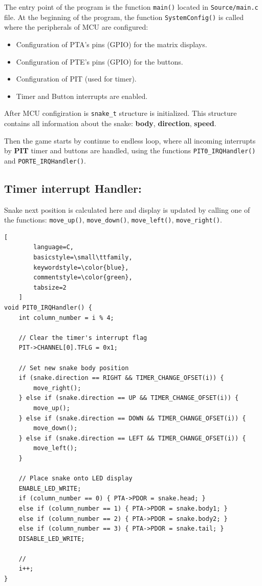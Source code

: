 \documentclass[a4paper, 11pt]{article}
\begin{document}
    The entry point of the program is the function \texttt{main()} located in
    \texttt{Source/main.c} file.
    At the beginning of the program, the function \texttt{SystemConfig()} is called
    where the peripherals of MCU are configured:
    \begin{itemize}
        \item Configuration of PTA's pins (GPIO) for the matrix displays.
        \item Configuration of PTE's pins (GPIO) for the buttons.
        \item Configuration of PIT (used for timer).
        \item Timer and Button interrupts are enabled.
    \end{itemize}

    After MCU configiration is \texttt{snake\_t} structure is initialized.
    This structure contains all information about the snake:
    \textbf{body}, \textbf{direction}, \textbf{speed}.

    Then the game starts
    by continue to endless loop, where all incoming interrupts
    by \textbf{PIT} timer and buttons are handled, using the functions
    \texttt{PIT0\_IRQHandler()} and \texttt{PORTE\_IRQHandler()}.

    \subsection{Timer interrupt Handler:}
    Snake next position is calculated here and display is
    updated by calling one of the functions:
    \texttt{move\_up()}, \texttt{move\_down()}, \texttt{move\_left()},
    \texttt{move\_right()}.

    \begin{lstlisting}[
        language=C,
        basicstyle=\small\ttfamily,
        keywordstyle=\color{blue},
        commentstyle=\color{green},
        tabsize=2
    ]
void PIT0_IRQHandler() {
    int column_number = i % 4;

    // Clear the timer's interrupt flag
    PIT->CHANNEL[0].TFLG = 0x1;

    // Set new snake body position
    if (snake.direction == RIGHT && TIMER_CHANGE_OFSET(i)) {
        move_right();
    } else if (snake.direction == UP && TIMER_CHANGE_OFSET(i)) {
        move_up();
    } else if (snake.direction == DOWN && TIMER_CHANGE_OFSET(i)) {
        move_down();
    } else if (snake.direction == LEFT && TIMER_CHANGE_OFSET(i)) {
        move_left();
    }

    // Place snake onto LED display
    ENABLE_LED_WRITE;
    if (column_number == 0) { PTA->PDOR = snake.head; }
    else if (column_number == 1) { PTA->PDOR = snake.body1; }
    else if (column_number == 2) { PTA->PDOR = snake.body2; }
    else if (column_number == 3) { PTA->PDOR = snake.tail; }
    DISABLE_LED_WRITE;

    //
    i++;
}
    \end{lstlisting}
\end{document}
